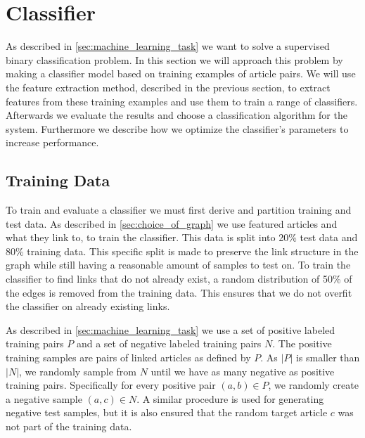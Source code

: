 \section{Classifier}\label{sec:classifier}
As described in \cref{sec:machine_learning_task} we want to solve a supervised binary classification problem. In this section we will approach this problem by making a classifier model based on training examples of article pairs. We will use the feature extraction method, described in the previous section, to extract features from these training examples and use them to train a range of classifiers. Afterwards we evaluate the results and choose a classification algorithm for the system. Furthermore we describe how we optimize the classifier's parameters to increase performance.

\subsection{Training Data}\label{sec:training_data}
To train and evaluate a classifier we must first derive and partition training and test data. As described in \cref{sec:choice_of_graph} we use featured articles and what they link to, to train the classifier. This data is split into 20\% test data and 80\% training data. This specific split is made to preserve the link structure in the graph while still having a reasonable amount of samples to test on. To train the classifier to find links that do not already exist, a random distribution of 50\% of the edges is removed from the training data. This ensures that we do not overfit the classifier on already existing links. 


As described in \cref{sec:machine_learning_task} we use a set of positive labeled training pairs $P$ and a set of negative labeled training pairs $N$. The positive training samples are pairs of linked articles as defined by $P$. As $\left\vert{P}\right\vert$ is smaller than $\left\vert{N}\right\vert$, we randomly sample from $N$ until we have as many negative as positive training pairs. Specifically for every positive pair $(a,b) \in P$, we randomly create a negative sample $(a,c) \in N$. A similar procedure is used for generating negative test samples, but it is also ensured that the random target article $c$ was not part of the training data.

